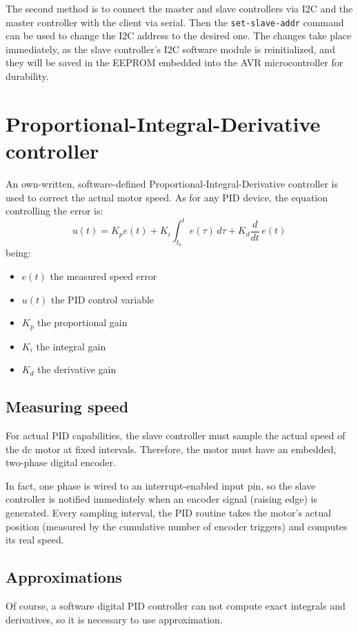 The second method is to connect the master and slave controllers via I2C and
the master controller with the client via serial. Then the
\texttt{set-slave-addr} command can be used to change the I2C address to the
desired one. The changes take place immediately, as the slave controller's I2C
software module is reinitialized, and they will be saved in the EEPROM embedded
into the AVR microcontroller for durability.

\section{Proportional-Integral-Derivative controller}
An own-written, software-defined Proportional-Integral-Derivative controller is
used to correct the actual motor speed. As for any PID device, the equation
controlling the error is:
\begin{equation}
  u(t) = K_p e(t) + K_i \int_{t_0}^t e(\tau)\,d\tau + K_d \frac{d}{dt}\,e(t)
\end{equation}
being:
\begin{itemize}
  \item $e(t)$ the measured speed error
  \item $u(t)$ the PID control variable
  \item $K_p$ the proportional gain
  \item $K_i$ the integral gain
  \item $K_d$ the derivative gain
\end{itemize}

\subsection{Measuring speed}
For actual PID capabilities, the slave controller must sample the actual speed
of the dc motor at fixed intervals. Therefore, the motor must have an embedded,
two-phase digital encoder.

In fact, one phase is wired to an interrupt-enabled input pin, so the slave
controller is notified immediately when an encoder signal (raising edge) is
generated. Every sampling interval, the PID routine takes the motor's actual
position (measured by the cumulative number of encoder triggers) and computes
its real speed.

\subsection{Approximations}
Of course, a software digital PID controller can not compute exact integrals
and derivatives, so it is necessary to use approximation.

